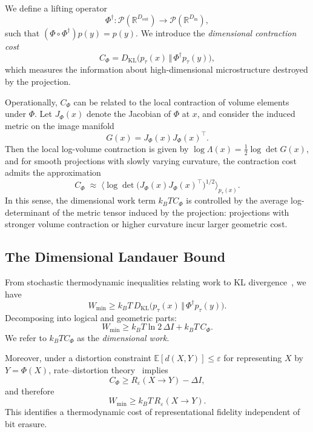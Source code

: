 \documentclass[12pt]{article}
\begin{document}
We define a lifting operator
\begin{equation}
\Phi^\dagger: \mathcal{P}(\mathbb{R}^{D_\mathrm{out}}) \to \mathcal{P}(\mathbb{R}^{D_\mathrm{in}}),
\end{equation}
such that $(\Phi\circ\Phi^\dagger)p(y) = p(y)$. We introduce the \emph{dimensional contraction cost}
\begin{equation}
C_\Phi = D_{\mathrm{KL}}\big(p_\tau(x)\,\Vert\,\Phi^\dagger p_\tau(y)\big),
\label{eq:Cphi}
\end{equation}
which measures the information about high-dimensional microstructure destroyed by the projection.

Operationally, $C_\Phi$ can be related to the local contraction of volume elements under $\Phi$. Let $J_\Phi(x)$ denote the Jacobian of $\Phi$ at $x$, and consider the induced metric on the image manifold
\[
G(x) = J_\Phi(x) J_\Phi(x)^\top.
\]
Then the local log-volume contraction is given by $\log \Lambda(x) = \tfrac{1}{2}\log \det G(x)$, and for smooth projections with slowly varying curvature, the contraction cost admits the approximation
\begin{equation}
C_\Phi \;\approx\; \Big\langle \log \det\big(J_\Phi(x) J_\Phi(x)^\top\big)^{1/2} \Big\rangle_{p_\tau(x)}.
\end{equation}
In this sense, the dimensional work term $k_B T C_\Phi$ is controlled by the average log-determinant of the metric tensor induced by the projection: projections with stronger volume contraction or higher curvature incur larger geometric cost.

\subsection{The Dimensional Landauer Bound}

From stochastic thermodynamic inequalities relating work to KL divergence~\citep{seifert2012,chen2021}, we have
\begin{equation}
W_{\min} \ge k_B T\, D_{\mathrm{KL}}\big(p_\tau(x)\,\Vert\,\Phi^\dagger p_\tau(y)\big).
\end{equation}
Decomposing into logical and geometric parts:
\begin{equation}
\boxed{
W_{\min} \ge k_B T \ln 2\, \Delta I + k_B T\, C_\Phi.
}
\label{eq:dim_landauer_box}
\end{equation}
We refer to $k_B T C_\Phi$ as the \emph{dimensional work}.

Moreover, under a distortion constraint $\mathbb{E}[d(X,Y)]\le\varepsilon$ for representing $X$ by $Y=\Phi(X)$, rate--distortion theory~\citep{cover2006} implies
\begin{equation}
C_\Phi \ge R_\varepsilon(X\to Y) - \Delta I,
\end{equation}
and therefore
\begin{equation}
W_{\min} \ge k_B T\, R_\varepsilon(X\to Y).
\end{equation}
This identifies a thermodynamic cost of representational fidelity independent of bit erasure.
\end{document}
